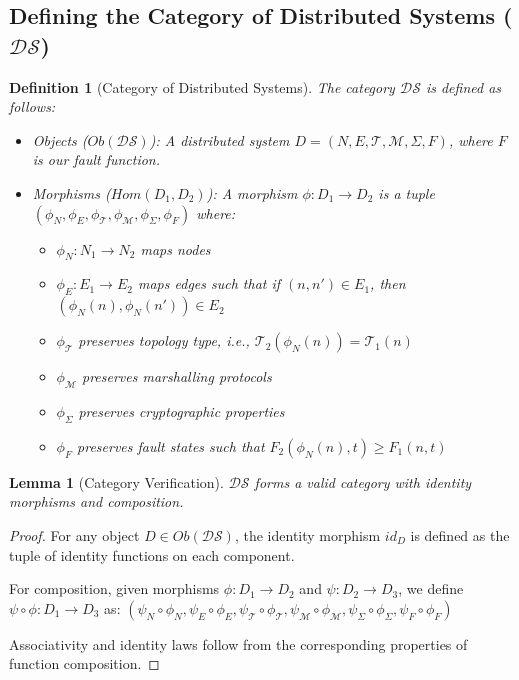 \documentclass{article}
\newtheorem{lemma}[theorem]{Lemma}
\newtheorem{definition}{Definition}
\begin{document}
\subsection{Defining the Category of Distributed Systems ($\mathcal{DS}$)}

\begin{definition}[Category of Distributed Systems]
The category $\mathcal{DS}$ is defined as follows:
\begin{itemize}
\item Objects ($Ob(\mathcal{DS})$): A distributed system $D = (N, E, \mathcal{T}, \mathcal{M}, \Sigma, F)$, where $F$ is our fault function.
\item Morphisms ($Hom(D_1, D_2)$): A morphism $\phi: D_1 \to D_2$ is a tuple $(\phi_N, \phi_E, \phi_\mathcal{T}, \phi_\mathcal{M}, \phi_\Sigma, \phi_F)$ where:
\begin{itemize}
\item $\phi_N: N_1 \to N_2$ maps nodes
\item $\phi_E: E_1 \to E_2$ maps edges such that if $(n, n') \in E_1$, then $(\phi_N(n), \phi_N(n')) \in E_2$
\item $\phi_\mathcal{T}$ preserves topology type, i.e., $\mathcal{T}_2(\phi_N(n)) = \mathcal{T}_1(n)$
\item $\phi_\mathcal{M}$ preserves marshalling protocols
\item $\phi_\Sigma$ preserves cryptographic properties
\item $\phi_F$ preserves fault states such that $F_2(\phi_N(n), t) \geq F_1(n, t)$
\end{itemize}
\end{itemize}
\end{definition}

\begin{lemma}[Category Verification]
$\mathcal{DS}$ forms a valid category with identity morphisms and composition.
\end{lemma}

\begin{proof}
For any object $D \in Ob(\mathcal{DS})$, the identity morphism $id_D$ is defined as the tuple of identity functions on each component.

For composition, given morphisms $\phi: D_1 \to D_2$ and $\psi: D_2 \to D_3$, we define $\psi \circ \phi: D_1 \to D_3$ as:
$(\psi_N \circ \phi_N, \psi_E \circ \phi_E, \psi_\mathcal{T} \circ \phi_\mathcal{T}, \psi_\mathcal{M} \circ \phi_\mathcal{M}, \psi_\Sigma \circ \phi_\Sigma, \psi_F \circ \phi_F)$

Associativity and identity laws follow from the corresponding properties of function composition.
\end{proof}
\end{document}
